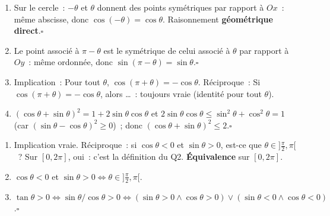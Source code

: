 
\begin{enumerate}
  \item Sur le cercle~: $-\theta$ et $\theta$ donnent des points sym\'etriques par rapport \`a $Ox$~:
        m\^eme abscisse, donc $\cos(-\theta)=\cos\theta$. Raisonnement \textbf{g\'eom\'etrique direct}.\hfill$\square$
  \item Le point associ\'e \`a $\pi-\theta$ est le sym\'etrique de celui associ\'e \`a $\theta$
        par rapport \`a $Oy$~: m\^eme ordonn\'ee, donc $\sin(\pi-\theta)=\sin\theta$.\hfill$\square$
  \item Implication~: \og Pour tout $\theta$, $\cos(\pi+\theta)=-\cos\theta$.\fg
        R\'eciproque~: \og Si $\cos(\pi+\theta)=-\cos\theta$, alors \ldots\fg~: toujours vraie (identit\'e pour tout $\theta$).
  \item $(\cos\theta+\sin\theta)^2=1+2\sin\theta\cos\theta$ et $2\sin\theta\cos\theta\leq\sin^2\theta+\cos^2\theta=1$
        (car $(\sin\theta-\cos\theta)^2\geq0$)~; donc $(\cos\theta+\sin\theta)^2\leq2$.\hfill$\square$
\end{enumerate}


\begin{enumerate}
  \item Implication vraie. R\'eciproque~: si $\cos\theta<0$ et $\sin\theta>0$, est-ce que $\theta\in]\frac{\pi}{2},\pi[$~?
        Sur $[0,2\pi]$, oui~: c'est la d\'efinition du Q2. \textbf{\'Equivalence} sur $[0,2\pi]$.
  \item $\cos\theta<0$ et $\sin\theta>0\Leftrightarrow\theta\in]\frac{\pi}{2},\pi[$.
  \item $\tan\theta>0\Leftrightarrow\sin\theta/\cos\theta>0\Leftrightarrow(\sin\theta>0\wedge\cos\theta>0)\vee(\sin\theta<0\wedge\cos\theta<0)$.\hfill$\square$
\end{enumerate}


